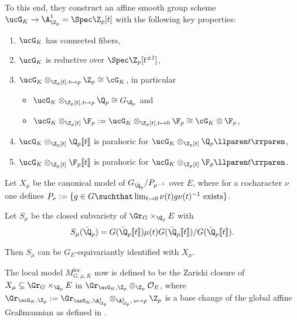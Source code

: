 \documentclass[a4paper]{scrartcl} %
\numberwithin{equation}{section}
\begin{document}
\begin{Remark}
  To this end, they construct an affine smooth group scheme $\ucG_K\to \A^1_{\Z_p}=\Spec \Z_p[t]$ with the following key properties:
  \begin{enumerate}[(1)]
  \item $\ucG_K$ has connected fibers,
  \item $\ucG_K$ is reductive over $\Spec \Z_p[t^{\pm 1}]$,
  \item $\ucG_K\otimes_{\Z_p[t],t\mapsto p}\Z_p\cong \cG_K$, in particular
    \begin{itemize}
    \item $\ucG_K\otimes_{\Z_p[t],t\mapsto p}\Q_p\cong G_{\Q_p}$ and
    \item $\ucG_K\otimes_{\Z_p[t]}\F_p:=\ucG_K\otimes_{\Z_p[t],t\mapsto 0}\F_p\cong \cG_K\otimes\F_p$,
    \end{itemize}
  \item  $\ucG_K\otimes_{\Z_p[t]}\Q_p\llbracket t\rrbracket$ is parahoric for $\ucG_K\otimes_{\Z_p[t]}\Q_p\llparen t\rrparen$,
  \item $\ucG_K\otimes_{\Z_p[t]}\F_p\llbracket t\rrbracket$ is parahoric for $\ucG_K\otimes_{\Z_p[t]}\F_p\llparen t\rrparen$.
  \end{enumerate}
\end{Remark}

\begin{DefinitionRemark}\label{pappzhu}
  Let $X_\mu$ be the canonical model of $G_{\bar\Q_p}/P_{\mu^{-1}}$ over $E$, where for a cocharacter $\nu$ one defines $P_{\nu}:=\{ g \in G \suchthat \lim_{t\to 0}\nu(t)g\nu(t)^{-1}\text{ exists}\}$.

  Let $S_\mu$ be the closed subvariety of $\Gr_{G}\times_{\Q_p}E$ with
  \begin{equation*}
    S_\mu(\bar\Q_p) = G(\bar\Q_p\llbracket t\rrbracket)\mu(t)G(\bar\Q_p\llbracket t\rrbracket) / G(\bar\Q_p\llbracket t\rrbracket).
\end{equation*}

  Then $S_\mu$ can be $G_E$-equivariantly identified with $X_\mu$.
\end{DefinitionRemark}

\begin{Definition}
  The local model $M^\mathrm{loc}_{G,\mu,K}$ now is defined to be the Zariski closure of $X_\mu\subseteq \Gr_{G}\times_{\Q_p} E$ in $\Gr_{\ucG_K,\Z_p}\otimes_{\Z_p}\mathcal{O}_E$, where $\Gr_{\ucG_K,\Z_p}:=\Gr_{\ucG_K,\A_{\Z_p}^1}\otimes_{\A^1_{\Z_p},\,u\mapsto p}\Z_p$ is a base change of the global affine Gra\ss{}mannian as defined in \cite{pappas-zhu}.
\end{Definition}
\end{document}
